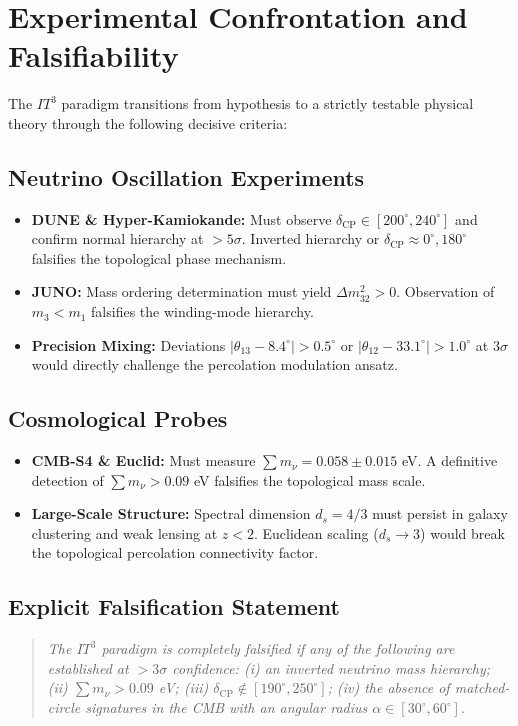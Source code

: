 \documentclass[12pt,a4paper]{article}
\begin{document}
\section{Experimental Confrontation and Falsifiability}
The $IT^3$ paradigm transitions from hypothesis to a strictly testable physical theory through the following decisive criteria:

\subsection{Neutrino Oscillation Experiments}

\begin{itemize}
    \item \textbf{DUNE \& Hyper-Kamiokande:} Must observe $\delta_{\text{CP}} \in [200^\circ, 240^\circ]$ and confirm normal hierarchy at $>5\sigma$. Inverted hierarchy or $\delta_{\text{CP}} \approx 0^\circ, 180^\circ$ falsifies the topological phase mechanism.
    \item \textbf{JUNO:} Mass ordering determination must yield $\Delta m^2_{32} > 0$. Observation of $m_3 < m_1$ falsifies the winding-mode hierarchy.
    \item \textbf{Precision Mixing:} Deviations $|\theta_{13} - 8.4^\circ| > 0.5^\circ$ or $|\theta_{12} - 33.1^\circ| > 1.0^\circ$ at $3\sigma$ would directly challenge the percolation modulation ansatz.
\end{itemize}

\subsection{Cosmological Probes}
\begin{itemize}
    \item \textbf{CMB-S4 \& Euclid:} Must measure $\sum m_\nu = 0.058 \pm 0.015$ eV. A definitive detection of $\sum m_\nu > 0.09$ eV falsifies the topological mass scale.
    \item \textbf{Large-Scale Structure:} Spectral dimension $d_s = 4/3$ must persist in galaxy clustering and weak lensing at $z < 2$. Euclidean scaling ($d_s \to 3$) would break the topological percolation connectivity factor.
\end{itemize}

\subsection{Explicit Falsification Statement}
\begin{quote}
\textit{The $IT^3$ paradigm is completely falsified if any of the following are established at $>3\sigma$ confidence: (i) an inverted neutrino mass hierarchy; (ii) $\sum m_\nu > 0.09$ eV; (iii) $\delta_{\text{CP}} \notin [190^\circ, 250^\circ]$; (iv) the absence of matched-circle signatures in the CMB with an angular radius $\alpha \in [30^\circ, 60^\circ]$.}
\end{quote}
\end{document}
